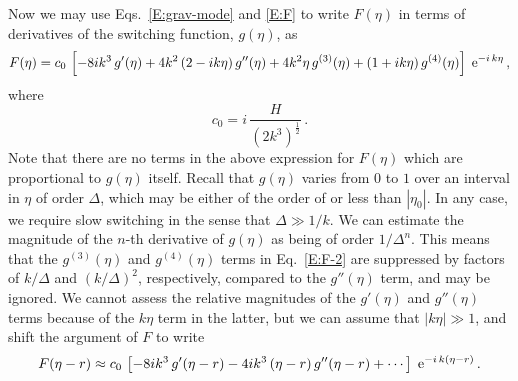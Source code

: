 \documentclass[preprint,prd,showpacs,superscriptaddress]{revtex4}
\begin{document}
Now we may use Eqs.~\eqref{E:grav-mode} and \eqref{E:F} to write $F(\eta)$ in terms of derivatives of the switching
function, $g(\eta)$, as
\begin{equation}
F(\eta) = c_0\, \left[-8ik^3\, g'(\eta) +4k^2\, (2-ik \eta)\, g''(\eta) +
4 k^2 \eta\, g^{(3)}(\eta) +(1+ik\eta)\,g^{(4)}(\eta)\right]\; {\rm e}^{-i\,k \eta} \,,
\label{E:F-2}
\end{equation}
where 
\begin{equation}
c_0 = i\,\frac{H}{(2k^{3})^{\frac{1}{2}}}\,.
\label{E:c0}
\end{equation}
Note that there are no terms in the above expression for $F(\eta)$ which are proportional to $g(\eta)$ itself. Recall that
$g(\eta)$ varies from $0$ to $1$ over an interval in $\eta$ of order $\Delta$, which may be either of the order of or less than
$|\eta_0|$. In any case, we require slow switching in the sense that $\Delta \gg 1/k$. We can estimate the magnitude of
the $n$-th derivative of
$g(\eta)$ as being of order $1/\Delta^n$. This means that the $g^{(3)}(\eta)$ and $g^{(4)}(\eta)$ terms in Eq.~\eqref{E:F-2}
are suppressed by factors of $k/\Delta$ and $(k/\Delta)^2$, respectively, compared to the $g''(\eta)$ term, and may be
ignored. We cannot assess the relative magnitudes of the  $g'(\eta)$ and  $g''(\eta)$ terms because of the  $k\eta$ term in the latter,
but we can assume that $|k\eta| \gg 1$, and shift the argument of $F$ to write
\begin{equation}
F(\eta-r) \approx c_0\, \left[-8ik^3\, g'(\eta-r) - 4ik^3\, (\eta-r)\, g''(\eta-r) + \cdots \right]\; {\rm e}^{-i\,k (\eta-r)} \,.
\label{E:Fa}
\end{equation}
\end{document}
